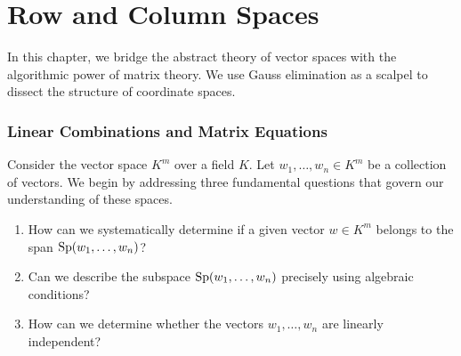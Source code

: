 \renewcommand{\thetheorem}{13.\arabic{theorem}}
\setcounter{theorem}{0}
\setcounter{chapter}{12} %

\chapter{Row and Column Spaces}

In this chapter, we bridge the abstract theory of vector spaces with the algorithmic power of matrix theory. We use Gauss elimination as a scalpel to dissect the structure of coordinate spaces.

\subsection{Linear Combinations and Matrix Equations}

Consider the vector space $K^{m}$ over a field $K$. Let $w_{1}, \dots, w_{n} \in K^{m}$ be a collection of vectors. We begin by addressing three fundamental questions that govern our understanding of these spaces.

\begin{question}
\label{q:foundational_questions}
\begin{enumerate}
    \item How can we systematically determine if a given vector $w \in K^{m}$ belongs to the span $\operatorname{Sp}(w_{1}, \dots, w_{n})$?
    \item Can we describe the subspace $\operatorname{Sp}(w_{1}, \dots, w_{n})$ precisely using algebraic conditions?
    \item How can we determine whether the vectors $w_{1}, \dots, w_{n}$ are linearly independent?
\end{enumerate}
\end{question}

